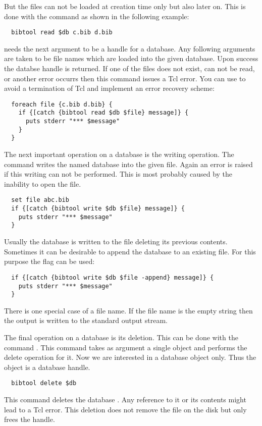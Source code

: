 But the files can not be loaded at creation time only but also later
on. This is done with the command  as shown in the
following example:
\begin{verbatim}
  bibtool read $db c.bib d.bib
\end{verbatim}%
 needs the next argument to be a handle for a
database. Any following arguments are taken to be file names which are
loaded into the given database. Upon success the databse handle is
returned. If one of the files does not exist, can not be read, or
another error occurrs then this command issues a Tcl error. You can
use  to avoid a termination of Tcl and implement an error
recovery scheme:
\begin{verbatim}
  foreach file {c.bib d.bib} {
    if {[catch {bibtool read $db $file} message]} {
      puts stderr "*** $message"
    }
  }
\end{verbatim}%
The next important operation on a database is the writing
operation. The command  writes the named database
into the given file. Again an error is raised if this writing can not
be performed. This is most probably caused by the inability to open
the file.
\begin{verbatim}
  set file abc.bib
  if {[catch {bibtool write $db $file} message]} {
    puts stderr "*** $message"
  }
\end{verbatim}%
Usually the database is written to the file deleting its previous
contents. Sometimes it can be desirable to append the database to an
existing file. For this purpose the flag  can be used:
\begin{verbatim}
  if {[catch {bibtool write $db $file -append} message]} {
    puts stderr "*** $message"
  }
\end{verbatim}%
There is one special case of a file name. If the file name is the
empty string then the output is written to the standard output stream.

The final operation on a database is its deletion. This can be done
with the command . This command takes as argument
a single \BibTool{} object and performs the delete operation for
it. Now we are interested in a database object only. Thus the object is a
database handle.
\begin{verbatim}
  bibtool delete $db
\end{verbatim}%
This command deletes the database . Any reference to it or
its contents might lead to a Tcl error. This deletion does not remove
the file on the disk but only frees the handle.

